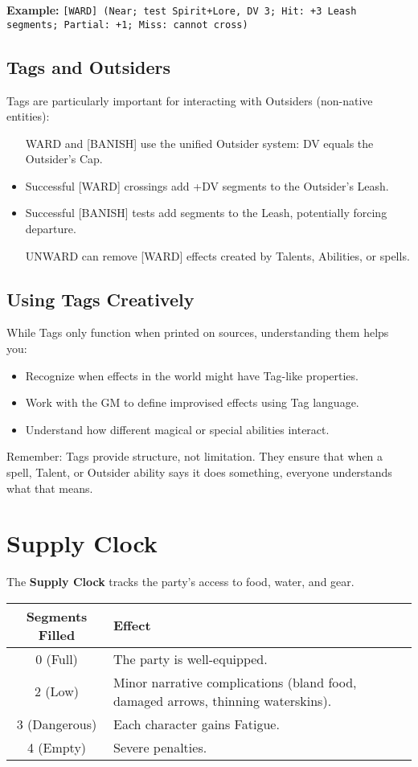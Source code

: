 \textbf{Example:} \texttt{[WARD] (Near; test Spirit+Lore, DV 3; Hit: +3 Leash segments; Partial: +1; Miss: cannot cross)}

\subsection*{Tags and Outsiders}

Tags are particularly important for interacting with Outsiders (non-native entities):
\begin{itemize}
  \item [WARD] and [BANISH] use the unified Outsider system: DV equals the Outsider's Cap.
  \item Successful [WARD] crossings add +DV segments to the Outsider's Leash.
  \item Successful [BANISH] tests add segments to the Leash, potentially forcing departure.
  \item [UNWARD] can remove [WARD] effects created by Talents, Abilities, or spells.
\end{itemize}

\subsection*{Using Tags Creatively}

While Tags only function when printed on sources, understanding them helps you:
\begin{itemize}
  \item Recognize when effects in the world might have Tag-like properties.
  \item Work with the GM to define improvised effects using Tag language.
  \item Understand how different magical or special abilities interact.
\end{itemize}

Remember: Tags provide structure, not limitation. They ensure that when a spell, Talent, or Outsider ability says it does something, everyone understands what that means.

\section{Supply Clock}

The \textbf{Supply Clock} tracks the party's access to food, water, and gear.

\begin{center}
\begin{tabular}{cl}
\toprule
\textbf{Segments Filled} & \textbf{Effect} \\
\midrule
0 (Full) & The party is well-equipped. \\
2 (Low) & Minor narrative complications (bland food, damaged arrows, thinning waterskins). \\
3 (Dangerous) & Each character gains Fatigue. \\
4 (Empty) & Severe penalties. \\
\bottomrule
\end{tabular}
\end{center}

